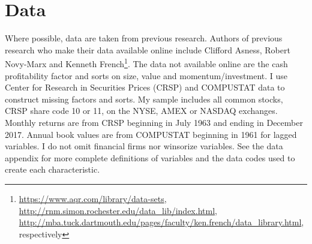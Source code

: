 
\section*{Data}

Where possible, data are taken from previous research. Authors of previous research who
make their data available online include Clifford Asness, Robert Novy-Marx  and Kenneth
French\footnote{
\url{https://www.aqr.com/library/data-sets},
\url{http://rnm.simon.rochester.edu/data_lib/index.html},
\url{http://mba.tuck.dartmouth.edu/pages/faculty/ken.french/data_library.html},
respectively}.
The data not available online are the cash profitability factor and sorts on size, value
and momentum/investment. I use Center for Research in Securities Prices (CRSP) and
COMPUSTAT data to construct missing factors and sorts. My sample includes all common
stocks, CRSP share code 10 or 11, on the NYSE, AMEX or NASDAQ exchanges. Monthly returns
are from CRSP beginning in July 1963 and ending in December 2017. Annual book values are
from COMPUSTAT beginning in 1961 for lagged variables. I do not omit financial firms nor
winsorize variables. See the data appendix for more complete definitions of variables and
the data codes used to create each characteristic.


